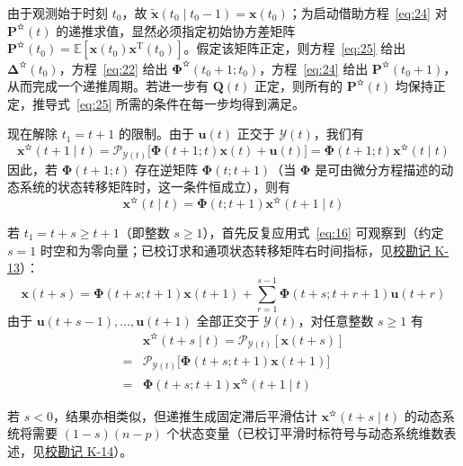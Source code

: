 由于观测始于时刻 $t_0$，故 $\tilde{\bm{x}}(t_0 \mid t_0 - 1) = \bm{x}(t_0)$；为启动借助方程~\eqref{eq:24} 对 $\bm{P}^{\text{✫}}(t)$ 的递推求值，显然必须指定初始协方差矩阵 $\bm{P}^{\text{✫}}(t_0) = \mathbb{E}[\bm{x}(t_0)\bm{x}^{\mathrm{T}}(t_0)]$。假定该矩阵正定，则方程~\eqref{eq:25} 给出 $\bm{\Delta}^{\text{✫}}(t_0)$，方程~\eqref{eq:22} 给出 $\bm{\Phi}^{\text{✫}}(t_0 + 1; t_0)$，方程~\eqref{eq:24} 给出 $\bm{P}^{\text{✫}}(t_0 + 1)$，从而完成一个递推周期。若进一步有 $\bm{Q}(t)$ 正定，则所有的 $\bm{P}^{\text{✫}}(t)$ 均保持正定，推导式~\eqref{eq:25} 所需的条件在每一步均得到满足。

现在解除 $t_1 = t + 1$ 的限制。由于 $\bm{u}(t)$ 正交于 $\mathcal{Y}(t)$，我们有
\begin{equation*}
\bm{x}^{\text{✫}}(t + 1 \mid t) = \mathscr{P}_{\mathcal{Y}(t)}\bigl[\bm{\Phi}(t + 1; t)\bm{x}(t) + \bm{u}(t)\bigr] = \bm{\Phi}(t + 1; t)\bm{x}^{\text{✫}}(t \mid t)
\end{equation*}
因此，若 $\bm{\Phi}(t + 1; t)$ 存在逆矩阵 $\bm{\Phi}(t; t + 1)$（当 $\bm{\Phi}$ 是可由微分方程描述的动态系统的状态转移矩阵时，这一条件恒成立），则有
\begin{equation*}
\bm{x}^{\text{✫}}(t \mid t) = \bm{\Phi}(t; t + 1)\bm{x}^{\text{✫}}(t + 1 \mid t)
\end{equation*}

若 $t_1 = t + s \geq t + 1$（即整数 $s \geq 1$），首先反复应用式~\eqref{eq:16} 可观察到（约定 $s = 1$ 时空和为零向量；已校订求和通项状态转移矩阵右时间指标，见\hyperref[sec:k13]{校勘记 K-13}）：
\begin{equation*}
\bm{x}(t + s) = \bm{\Phi}(t + s; t + 1)\bm{x}(t + 1) + \sum_{r=1}^{s-1} \bm{\Phi}(t + s; t + r + 1)\bm{u}(t + r)
\end{equation*}
由于 $\bm{u}(t + s - 1), \dots, \bm{u}(t + 1)$ 全部正交于 $\mathcal{Y}(t)$，对任意整数 $s \geq 1$ 有
\begin{equation*}
\begin{aligned}
&\bm{x}^{\text{✫}}(t + s \mid t) = \mathscr{P}_{\mathcal{Y}(t)}[\bm{x}(t + s)] \\
= &\mathscr{P}_{\mathcal{Y}(t)}\bigl[\bm{\Phi}(t + s; t + 1)\bm{x}(t + 1)\bigr] \\
= &\bm{\Phi}(t + s; t + 1)\bm{x}^{\text{✫}}(t + 1 \mid t)
\end{aligned}
\end{equation*}

若 $s < 0$，结果亦相类似，但递推生成固定滞后平滑估计 $\bm{x}^{\text{✫}}(t + s \mid t)$ 的动态系统将需要 $(1 - s)(n - p)$ 个状态变量（已校订平滑时标符号与动态系统维数表述，见\hyperref[sec:k14]{校勘记 K-14}）。

